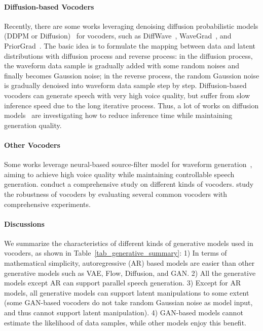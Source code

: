 \documentclass{article}
\begin{document}
\paragraph{Diffusion-based Vocoders} Recently, there are some works leveraging denoising diffusion probabilistic models (DDPM or Diffusion)~\cite{ho2020denoising} for vocoders, such as DiffWave~\cite{kong2020diffwave}, WaveGrad~\cite{chen2020wavegrad}, and PriorGrad~\cite{lee2021priorgrad}. The basic idea is to formulate the mapping between data and latent distributions with diffusion process and reverse process: in the diffusion process, the waveform data sample is gradually added with some random noises and finally becomes Gaussion noise; in the reverse process, the random Gaussion noise is gradually denoised into waveform data sample step by step. Diffusion-based vocoders can generate speech with very high voice quality, but suffer from slow inference speed due to the long iterative process. Thus, a lot of works on diffusion models~\cite{song2020denoising,lee2021priorgrad,watson2021learning,kong2021fast} are investigating how to reduce inference time while maintaining generation quality.


\paragraph{Other Vocoders}
Some works leverage neural-based source-filter model for waveform generation~\cite{wang2019neural_b,wang2019neural,wangneural,liu2020neural,juvela2019gelp,juvela2019glotnet,engel2019ddsp,song2020neural,yoneyama2021unified}, aiming to achieve high voice quality while maintaining controllable speech generation. \citet{govalkar2019comparison} conduct a comprehensive study on different kinds of vocoders. \citet{hsu2019towards} study the robustness of vocoders by evaluating several common vocoders with comprehensive experiments. 


\paragraph{Discussions} We summarize the characteristics of different kinds of generative models used in vocoders, as shown in Table~\ref{tab_generative_summary}: 1) In terms of mathematical simplicity, autoregressive (AR) based models are easier than other generative models such as VAE, Flow, Diffusion, and GAN. 2) All the generative models except AR can support parallel speech generation. 3) Except for AR models, all generative models can support latent manipulations to some extent (some GAN-based vocoders do not take random Gaussian noise as model input, and thus cannot support latent manipulation). 4) GAN-based models cannot estimate the likelihood of data samples, while other models enjoy this benefit. 
\end{document}

